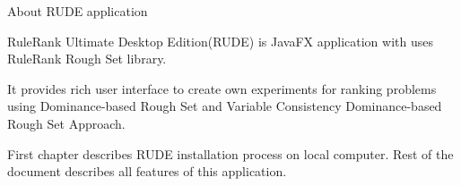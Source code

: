 \begin{Large}
	About RUDE application
\end{Large}
\newline

RuleRank Ultimate Desktop Edition(RUDE) is JavaFX application with uses RuleRank Rough Set library.
\newline

It provides rich user interface to create own experiments for ranking problems using Dominance-based Rough Set and Variable Consistency Dominance-based Rough Set Approach.
\newline

First chapter describes RUDE installation process on local computer. Rest of the document describes all features of this application.

\vfill\newpage